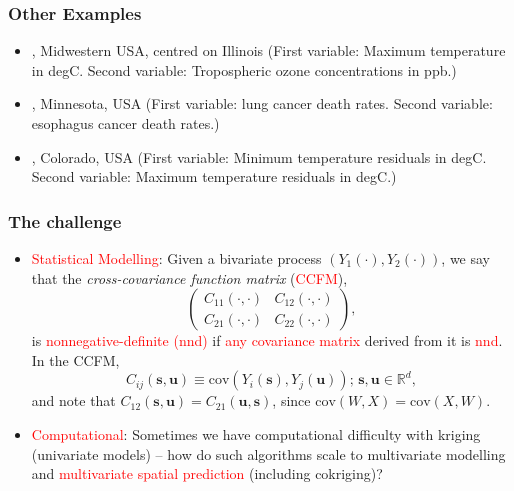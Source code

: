 \documentclass{beamer}
\newcommand{\svec} {\textbf{s}}
\newcommand{\uvec} {\textbf{u}}
\newcommand{\s}{\mathbf{s}}
\renewcommand{\u}{\mathbf{u}}
\newcommand{\cov}{\mathrm{cov}}
\begin{document}

\begin{frame}
\frametitle{Other Examples}
\begin{itemize}
\item \cite{RoyleBerliner1999}, Midwestern USA, centred on Illinois (First variable: Maximum temperature in degC. Second variable: Tropospheric ozone concentrations in ppb.) \vfill
\item \citet*{Jin_2005}, Minnesota, USA (First variable: lung cancer death rates. Second variable: esophagus cancer death rates.) \vfill
\item \citet*{GentonKleiber2015}, Colorado, USA (First variable: Minimum temperature residuals in degC. Second variable: Maximum temperature residuals in degC.) \vfill
\end{itemize}
\vfill
\end{frame}


\begin{frame}
\frametitle{The challenge}

\begin{itemize}
\item \textcolor{red}{Statistical Modelling}: Given a bivariate process $(Y_1(\cdot), Y_2(\cdot))$, we say that the \emph{cross-covariance function matrix} (\textcolor{red}{CCFM}),
\begin{equation*}
\label{eq1}
\left(\begin{array}{cc} C_{11}(\cdot,\cdot) & C_{12}(\cdot,\cdot) \\ C_{21}(\cdot,\cdot) & C_{22}(\cdot,\cdot)\end{array} \right),
\end{equation*}
is \textcolor{red}{nonnegative-definite (nnd)} if \textcolor{red}{any covariance matrix} derived from it is \textcolor{red}{nnd}. In the CCFM,
$$
C_{ij}(\s,\u)\equiv\cov(Y_i(\s),Y_j(\u));\,\s,\u\in\mathbb{R}^d,
$$
and note that $C_{12}(\svec,\uvec)=C_{21}(\uvec,\svec)$, since $\cov(W,X)=\cov(X,W)$.
\item \textcolor{red}{Computational}: Sometimes we have computational difficulty with kriging (univariate models) -- how do such algorithms scale to multivariate modelling and \textcolor{red}{multivariate spatial prediction} (including cokriging)? %
\end{itemize}
\end{frame}
\end{document}
